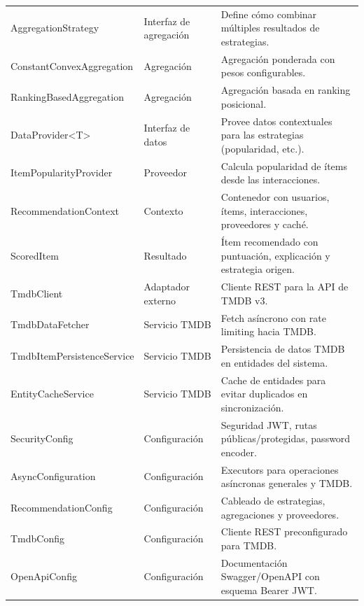 \begin{longtable}{L{4.3cm} L{2.4cm} L{6.6cm}}
AggregationStrategy & Interfaz de agregación & Define cómo combinar múltiples resultados de estrategias. \\
ConstantConvexAggregation & Agregación & Agregación ponderada con pesos configurables. \\
RankingBasedAggregation & Agregación & Agregación basada en ranking posicional. \\
DataProvider<T> & Interfaz de datos & Provee datos contextuales para las estrategias (popularidad, etc.). \\
ItemPopularityProvider & Proveedor & Calcula popularidad de ítems desde las interacciones. \\
RecommendationContext & Contexto & Contenedor con usuarios, ítems, interacciones, proveedores y caché. \\
ScoredItem & Resultado & Ítem recomendado con puntuación, explicación y estrategia origen. \\
TmdbClient & Adaptador externo & Cliente REST para la API de TMDB v3. \\
TmdbDataFetcher & Servicio TMDB & Fetch asíncrono con rate limiting hacia TMDB. \\
TmdbItemPersistenceService & Servicio TMDB & Persistencia de datos TMDB en entidades del sistema. \\
EntityCacheService & Servicio TMDB & Cache de entidades para evitar duplicados en sincronización. \\
SecurityConfig & Configuración & Seguridad JWT, rutas públicas/protegidas, password encoder. \\
AsyncConfiguration & Configuración & Executors para operaciones asíncronas generales y TMDB. \\
RecommendationConfig & Configuración & Cableado de estrategias, agregaciones y proveedores. \\
TmdbConfig & Configuración & Cliente REST preconfigurado para TMDB. \\
OpenApiConfig & Configuración & Documentación Swagger/OpenAPI con esquema Bearer JWT. \\
\bottomrule
\end{longtable}


